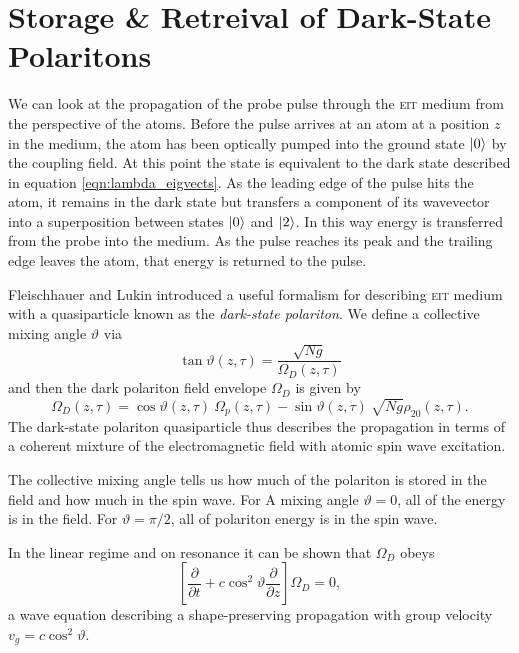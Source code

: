 \section{Storage \& Retreival of Dark-State Polaritons}
  \label{sec:polaritons_storage}

    We can look at the propagation of the probe pulse through the \textsc{eit}
    medium from the perspective of the atoms. Before the pulse arrives at an
    atom at a position $z$ in the medium, the atom has been optically pumped
    into the ground state $\Ket{0}$ by the coupling field. At this point the
    state is equivalent to the dark state described in equation
    \ref{eqn:lambda_eigvects}. As the leading edge of the pulse hits the atom,
    it remains in the dark state but transfers a component of its wavevector
    into a superposition between states $\Ket{0}$ and $\Ket{2}$. In this way
    energy is transferred from the probe into the medium. As the pulse reaches
    its peak and the trailing edge leaves the atom, that energy is returned to
    the pulse.

    Fleischhauer and Lukin\cite{Fleischhauer2000} introduced a useful formalism
    for describing \textsc{eit} medium with a quasiparticle known as the \textit
    {dark-state polariton}. We define a collective mixing angle $\vartheta$ via
    \begin{equation}
      \tan{\vartheta}(z, \tau) = \frac{\sqrt{Ng}}{\Omega_D(z, \tau)}
    \end{equation}
    and then the dark polariton field envelope $\Omega_D$ is given by
    \begin{equation}
      \Omega_D(z,\tau) = \cos{\vartheta}(z, \tau)~\Omega_p(z, \tau) - 
        \sin{\vartheta}(z, \tau) ~ \sqrt{Ng} \rho_{20}(z, \tau).
    \end{equation}
    The dark-state polariton quasiparticle thus describes the propagation in
    terms of a coherent mixture of the electromagnetic field with atomic spin
    wave excitation. 

    The collective mixing angle tells us how much of the polariton is stored in
    the field and how much in the spin wave. For A mixing angle $\vartheta = 0$,
    all of the energy is in the field. For $\vartheta = \pi/2$, all of polariton
    energy is in the spin wave.
    
    In the linear regime and on resonance it can be shown\cite{lambropoulos2007fundamentals} that
    $\Omega_D$ obeys 
    \begin{equation}
      \left[ \frac{\partial}{\partial t} + c \cos^2 \vartheta 
      \frac{\partial}{\partial z} \right] \Omega_D = 0,
    \end{equation}
    a wave equation describing a shape-preserving propagation with group
    velocity $v_g = c \cos^2 \vartheta$.

